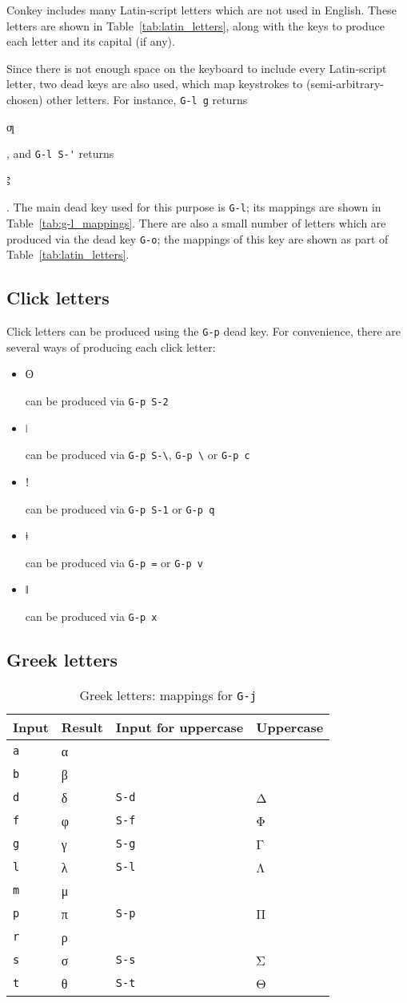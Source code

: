 \documentclass[oneside]{memoir}
\newcommand{\key}{\verb}
\newcommand{\keynv}{\texttt}
\newcommand{\out}[1]{\colorbox{gray!20}{\strut{}#1}}
\begin{document}
Conkey includes many Latin-script letters which are not used in English.
These letters are shown in Table~\ref{tab:latin_letters}, along with the keys to produce each letter and its capital (if any).

Since there is not enough space on the keyboard to include every Latin-script letter,
  two dead keys are also used, which map keystrokes to (semi-arbitrary-chosen) other letters.
For instance, \key|G-l g| returns \out{ƣ}, and \key|G-l S-'| returns \out{Ꜣ}.
The main dead key used for this purpose is \key|G-l|;
  its mappings are shown in Table~\ref{tab:g-l_mappings}.
There are also a small number of letters which are produced via the dead key \key|G-o|;
  the mappings of this key are shown as part of Table~\ref{tab:latin_letters}.

\subsection{Click letters}
\label{sec:clicks}

Click letters can be produced using the \key|G-p| dead key.
For convenience, there are several ways of producing each click letter:

\begin{itemize}[noitemsep]
\item \out{ʘ} can be produced via \key|G-p S-2|
\item \out{ǀ} can be produced via \key|G-p S-\|, \key|G-p \| or \key|G-p c|
\item \out{ǃ} can be produced via \key|G-p S-1| or \key|G-p q|
\item \out{ǂ} can be produced via \key|G-p =| or \key|G-p v|
\item \out{ǁ} can be produced via \key|G-p x|
\end{itemize}

\subsection{Greek letters}
\label{sec:greek_letters}

\begin{table}
\centering
\caption{Greek letters: mappings for \keynv{G-j}}
\label{tab:greek_letters}
\begin{tabular}{llll}
\toprule
Input & Result & Input for uppercase & Uppercase \\
\midrule
\key|a| & α & & \\
\key|b| & β & & \\
\key|d| & δ & \key|S-d| & Δ \\
\key|f| & φ & \key|S-f| & Φ \\
\key|g| & γ & \key|S-g| & Γ \\
\key|l| & λ & \key|S-l| & Λ \\
\key|m| & μ & & \\
\key|p| & π & \key|S-p| & Π \\
\key|r| & ρ & & \\
\key|s| & σ & \key|S-s| & Σ \\
\key|t| & θ & \key|S-t| & Θ \\
\bottomrule
\end{tabular}
\end{table}
\end{document}
